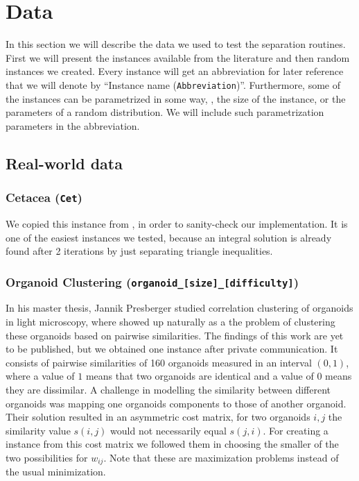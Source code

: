 \section{Data}\label{sec:data}
In this section we will describe the data we used to test the separation routines.
First we will present the instances available from the literature and then random instances we created.
Every instance will get an abbreviation for later reference that we will denote by “Instance name (\texttt{Abbreviation})”.
Furthermore, some of the instances can be parametrized in some way, \eg, the size of the instance, or the parameters of a random distribution.
We will include such parametrization parameters in the abbreviation.

\subsection{Real-world data}
\subsubsection{Cetacea (\texttt{Cet})}\label{subsubsec:data_cetacea}
We copied this instance from \cite{grotschelCuttingPlaneAlgorithm1989}, in order to sanity-check our implementation.
It is one of the easiest instances we tested, because an integral solution is already found after 2 iterations by just separating triangle inequalities.

\subsubsection{Organoid Clustering (\texttt{organoid\_[size]\_[difficulty]})}
In his master thesis, Jannik Presberger studied correlation clustering of organoids in light microscopy, where \CP showed up naturally as a the problem of clustering these organoids based on pairwise similarities.
The findings of this work are yet to be published, but we obtained one instance after private communication.
It consists of pairwise similarities of 160 organoids measured in an interval $(0,1)$, where a value of $1$ means that two organoids are identical and a value of $0$ means they are dissimilar.
A challenge in modelling the similarity between different organoids was mapping one organoids components to those of another organoid.
Their solution resulted in an asymmetric cost matrix, \ie for two organoids $i, j$ the similarity value $s(i,j)$ would not necessarily equal $s(j,i)$.
For creating a \CP instance from this cost matrix we followed them in choosing the smaller of the two possibilities for $w_{ij}$.
Note that these are maximization problems instead of the usual minimization.


